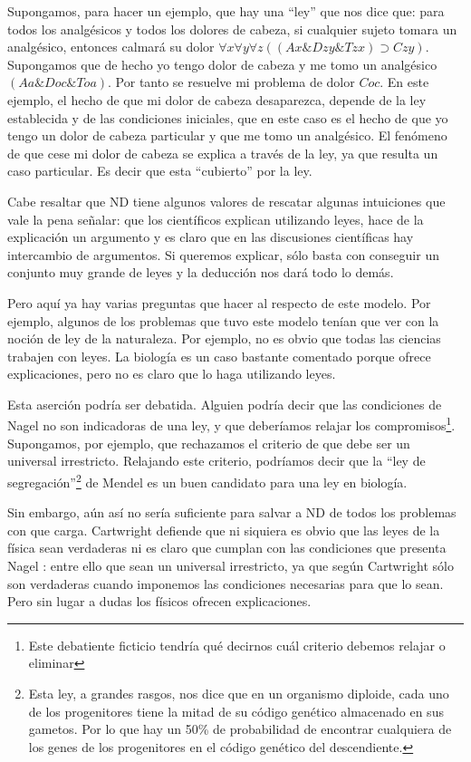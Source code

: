 Supongamos, para hacer un ejemplo, que hay una ``ley'' que nos dice que: para todos los analgésicos y todos los dolores de cabeza, si cualquier sujeto tomara un analgésico, entonces calmará su dolor $\forall{x}\forall{y}\forall{z}((Ax\&Dzy\&Tzx)\supset Czy)$. Supongamos que de hecho yo tengo dolor de cabeza y me tomo un analgésico $(Aa \& Doc \& Toa)$. Por tanto se resuelve mi problema de dolor $Coc$. En este ejemplo, el hecho de que mi dolor de cabeza desaparezca, depende de la ley establecida y de las condiciones iniciales, que en este caso es el hecho de que yo tengo un dolor de cabeza particular y que me tomo un analgésico. El fenómeno de que cese mi dolor de cabeza se explica a través de la ley, ya que resulta un caso particular. Es decir que esta ``cubierto'' por la ley.

Cabe resaltar que ND tiene algunos valores de rescatar algunas intuiciones que vale la pena señalar: que los científicos explican utilizando leyes, hace de la explicación un argumento y es claro que en las discusiones científicas hay intercambio de argumentos. Si queremos explicar, sólo basta con conseguir un conjunto muy grande de leyes y la deducción nos dará todo lo demás.

Pero aquí ya hay varias preguntas que hacer al respecto de este modelo. Por ejemplo, algunos de los problemas que tuvo este modelo tenían que ver con la noción de ley de la naturaleza. Por ejemplo, no es obvio que todas las ciencias trabajen con leyes. La biología es un caso bastante comentado porque ofrece explicaciones, pero no es claro que lo haga utilizando leyes.

Esta aserción podría ser debatida. Alguien podría decir que las condiciones de Nagel no son indicadoras de una ley, y que deberíamos relajar los compromisos\footnote{Este debatiente ficticio tendría qué decirnos cuál criterio debemos relajar o eliminar}. Supongamos, por ejemplo, que rechazamos el criterio de que debe ser un universal irrestricto. Relajando este criterio, podríamos decir que la ``ley de segregación''\footnote{Esta ley, a grandes rasgos, nos dice que en un organismo diploide, cada uno de los progenitores tiene la mitad de su código genético almacenado en sus gametos. Por lo que hay un 50\% de probabilidad de encontrar cualquiera de los genes de los progenitores en el código genético del descendiente.} de Mendel es un buen candidato para una ley en biología.

Sin embargo, aún así no sería suficiente para salvar a ND de todos los problemas con que carga. Cartwright defiende que ni siquiera es obvio que las leyes de la física sean verdaderas ni es claro que cumplan con las condiciones que presenta Nagel \cite{Cartwright1983}: entre ello que sean un universal irrestricto, ya que según Cartwright sólo son verdaderas cuando imponemos las condiciones necesarias para que lo sean. Pero sin lugar a dudas los físicos ofrecen explicaciones.

